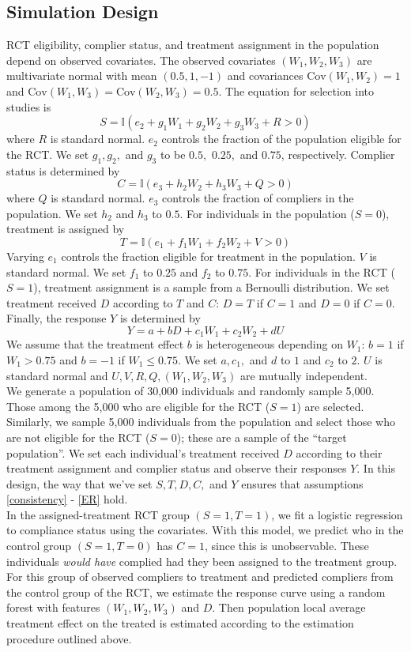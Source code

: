 \documentclass[12pt]{article}
\newcommand{\ind}{\mathbb{I}} %
\newcommand{\cov}{\mathrm{Cov}}
\begin{document}
\subsection{Simulation Design}
RCT eligibility, complier status, and treatment assignment in the population depend on observed covariates. 
The observed covariates $(W_1, W_2, W_3)$ are multivariate normal with mean $(0.5, 1, -1)$ and covariances $\cov(W_1, W_2) = 1$ and $\cov(W_1, W_3) = \cov(W_2, W_3) = 0.5$. 
 The  equation for selection into studies is
 $$ S = \ind(e_2 + g_1W_1 + g_2W_2 + g_3W_3 + R > 0)$$
  where $R$ is standard normal. $e_2$ controls the fraction of the population eligible for the RCT. We set $g_1, g_2,$ and $g_3$ to be $0.5,$ $0.25,$ and $0.75$, respectively.
Complier status is determined by
$$C = \ind(e_3 + h_2W_2 + h_3W_3 + Q > 0)$$
where $Q$ is standard normal. $e_3$ controls the fraction of compliers in the population. We set $h_2$ and $h_3$ to $0.5$.
 For individuals in the population ($S=0$),  treatment is assigned by
  $$T = \ind(e_1 + f_1W_1 + f_2W_2 + V > 0)$$
Varying $e_1$ controls the fraction eligible for treatment in the population. $V$ is standard normal. We set $f_1$ to $0.25$ and $f_2$ to $0.75$.  For individuals in the RCT ($S=1$), treatment assignment is a sample from a Bernoulli distribution.
We set treatment received $D$ according to $T$ and $C$: $D = T$ if $C=1$ and $D = 0$ if $C=0$.
Finally, the response $Y$ is determined by 
$$Y = a + bD + c_1W_1 + c_2W_2 + dU$$
 We assume that the treatment effect $b$ is heterogeneous depending on $W_1$: $b = 1$ if $W_1 > 0.75$ and $b=-1$ if $W_1 \leq 0.75$.   We set $a, c_1,$ and $d$ to $1$ and $c_2$ to $2$. $U$ is standard normal and $U, V, R, Q, (W_1, W_2, W_3)$ are mutually independent.\\
 
 We generate a population of 30,000 individuals and randomly sample 5,000.  Those among the 5,000 who are eligible for the RCT ($S=1$) are selected. Similarly, we sample 5,000 individuals from the population and select those who are not eligible for the RCT ($S=0$); these are a sample of the ``target population''.  We set each individual's treatment received $D$ according to their treatment assignment and complier status and observe their responses $Y$.  In this design, the way that we've set $S, T, D, C,$ and $Y$ ensures that assumptions \eqref{consistency} - \eqref{ER} hold.\\
 
In the assigned-treatment RCT group $(S = 1, T = 1)$, we fit a logistic regression to compliance status using the covariates.  With this model, we predict who in the control group $(S = 1, T = 0)$ has $C=1$, since this is unobservable.  These individuals \textit{would have} complied had they been assigned to the treatment group.  For this group of observed compliers to treatment and predicted compliers from the control group of the RCT, we estimate the response curve using a random forest with features $(W_1, W_2, W_3)$ and $D$.  Then population local average treatment effect on the treated is estimated according to the estimation procedure outlined above.
\end{document}
